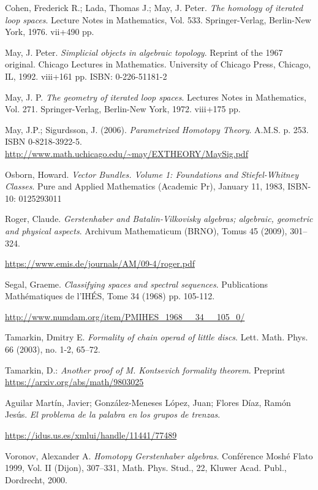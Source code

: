 \documentclass[TFM.tex]{subfiles}
\begin{document}
\begin{thebibliography}{}
 Cohen, Frederick R.; Lada, Thomas J.; May, J. Peter. \emph{The homology of iterated loop spaces}. Lecture Notes in Mathematics, Vol. 533. Springer-Verlag, Berlin-New York, 1976. vii+490 pp. %


  May, J. Peter. \emph{Simplicial objects in algebraic topology}. Reprint of the 1967 original. Chicago Lectures in Mathematics. University of Chicago Press, Chicago, IL, 1992. viii+161 pp. ISBN: 0-226-51181-2


 May, J. P.
\emph{The geometry of iterated loop spaces}. 
Lectures Notes in Mathematics, Vol. 271. Springer-Verlag, Berlin-New York, 1972. viii+175 pp. 


 May, J.P.; Sigurdsson, J. (2006). \emph{Parametrized Homotopy Theory}. A.M.S. p. 253. ISBN 0-8218-3922-5. \url{http://www.math.uchicago.edu/~may/EXTHEORY/MaySig.pdf}


 Osborn, Howard. \emph{Vector Bundles. Volume 1: Foundations and Stiefel-Whitney Classes}. Pure and Applied Mathematics (Academic Pr), January 11, 1983, ISBN-10: 0125293011


 Roger, Claude. \emph{Gerstenhaber and Batalin-Vilkovisky algebras; algebraic, geometric and physical aspects}. Archivum Mathematicum (BRNO), Tomus 45 (2009), 301–324. 

\url{https://www.emis.de/journals/AM/09-4/roger.pdf}


 Segal, Graeme. \emph{Classifying spaces and spectral sequences}. Publications Mathématiques de l'IHÉS, Tome 34 (1968) pp. 105-112.

 \url{http://www.numdam.org/item/PMIHES_1968__34__105_0/} %


 Tamarkin, Dmitry E. \emph{Formality of chain operad of little discs}. Lett. Math. Phys. 66 (2003), no. 1-2, 65–72. 

 Tamarkin, D.: \emph{Another proof of M. Kontsevich formality theorem}. Preprint \url{https://arxiv.org/abs/math/9803025}


 Aguilar Martín, Javier; González-Meneses López, Juan; Flores Díaz, Ramón Jesús. \emph{El problema de la palabra en los grupos de trenzas}.

 \url{https://idus.us.es/xmlui/handle/11441/77489}
 

 
 
 
 
  Voronov, Alexander A. \emph{Homotopy Gerstenhaber algebras}. Conférence Moshé Flato 1999, Vol. II (Dijon), 307–331, Math. Phys. Stud., 22, Kluwer Acad. Publ., Dordrecht, 2000.


\end{thebibliography}
\end{document}

